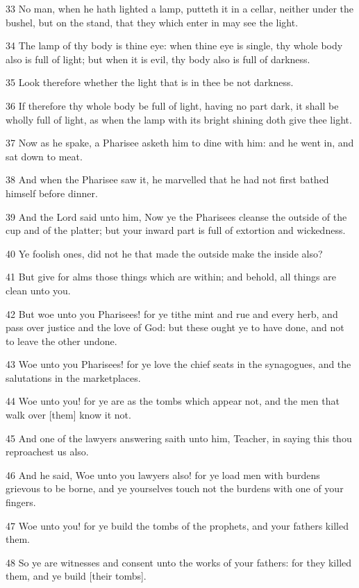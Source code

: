 \par 33 No man, when he hath lighted a lamp, putteth it in a cellar, neither under the bushel, but on the stand, that they which enter in may see the light.
\par 34 The lamp of thy body is thine eye: when thine eye is single, thy whole body also is full of light; but when it is evil, thy body also is full of darkness.
\par 35 Look therefore whether the light that is in thee be not darkness.
\par 36 If therefore thy whole body be full of light, having no part dark, it shall be wholly full of light, as when the lamp with its bright shining doth give thee light.
\par 37 Now as he spake, a Pharisee asketh him to dine with him: and he went in, and sat down to meat.
\par 38 And when the Pharisee saw it, he marvelled that he had not first bathed himself before dinner.
\par 39 And the Lord said unto him, Now ye the Pharisees cleanse the outside of the cup and of the platter; but your inward part is full of extortion and wickedness.
\par 40 Ye foolish ones, did not he that made the outside make the inside also?
\par 41 But give for alms those things which are within; and behold, all things are clean unto you.
\par 42 But woe unto you Pharisees! for ye tithe mint and rue and every herb, and pass over justice and the love of God: but these ought ye to have done, and not to leave the other undone.
\par 43 Woe unto you Pharisees! for ye love the chief seats in the synagogues, and the salutations in the marketplaces.
\par 44 Woe unto you! for ye are as the tombs which appear not, and the men that walk over [them] know it not.
\par 45 And one of the lawyers answering saith unto him, Teacher, in saying this thou reproachest us also.
\par 46 And he said, Woe unto you lawyers also! for ye load men with burdens grievous to be borne, and ye yourselves touch not the burdens with one of your fingers.
\par 47 Woe unto you! for ye build the tombs of the prophets, and your fathers killed them.
\par 48 So ye are witnesses and consent unto the works of your fathers: for they killed them, and ye build [their tombs].
